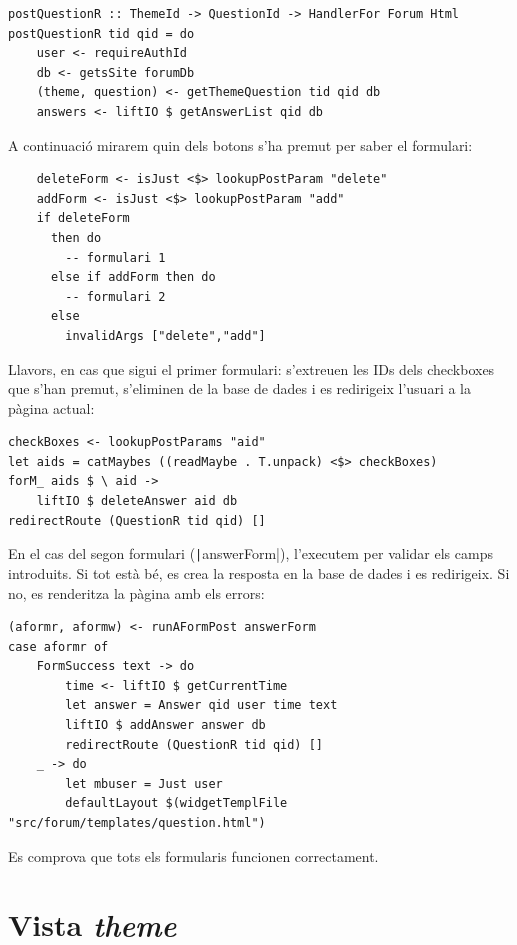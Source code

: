 \documentclass[catalan, a4paper]{scrartcl}
\begin{document}
\begin{verbatim}
postQuestionR :: ThemeId -> QuestionId -> HandlerFor Forum Html
postQuestionR tid qid = do
    user <- requireAuthId
    db <- getsSite forumDb
    (theme, question) <- getThemeQuestion tid qid db
    answers <- liftIO $ getAnswerList qid db
\end{verbatim}

A continuació mirarem quin dels botons s'ha premut per saber el formulari:

\begin{verbatim}
    deleteForm <- isJust <$> lookupPostParam "delete"
    addForm <- isJust <$> lookupPostParam "add"
    if deleteForm
      then do
        -- formulari 1
      else if addForm then do
        -- formulari 2
      else
        invalidArgs ["delete","add"]
\end{verbatim}

Llavors, en cas que sigui el primer formulari: s'extreuen les IDs dels
checkboxes que s'han premut, s'eliminen de la base de dades i es redirigeix
l'usuari a la pàgina actual:

\begin{verbatim}
checkBoxes <- lookupPostParams "aid"
let aids = catMaybes ((readMaybe . T.unpack) <$> checkBoxes)
forM_ aids $ \ aid ->
    liftIO $ deleteAnswer aid db
redirectRoute (QuestionR tid qid) []
\end{verbatim}

En el cas del segon formulari (\texttt|answerForm|), l'executem
per validar els camps introduits. Si tot està bé, es crea la resposta en la
base de dades i es redirigeix. Si no, es renderitza la pàgina amb els errors:

\begin{verbatim}
(aformr, aformw) <- runAFormPost answerForm
case aformr of
    FormSuccess text -> do
        time <- liftIO $ getCurrentTime
        let answer = Answer qid user time text
        liftIO $ addAnswer answer db
        redirectRoute (QuestionR tid qid) []
    _ -> do
        let mbuser = Just user
        defaultLayout $(widgetTemplFile "src/forum/templates/question.html")
\end{verbatim}

Es comprova que tots els formularis funcionen correctament.



\clearpage
\section{Vista \emph{theme}}
\end{document}
